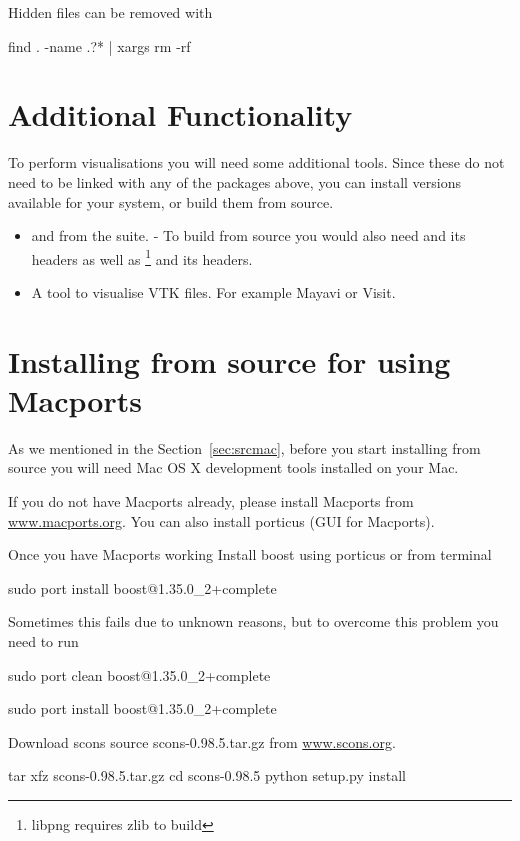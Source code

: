 Hidden files can be removed with
\begin{shellCode}
find . -name .?* | xargs rm -rf
\end{shellCode}

\section{Additional Functionality}\label{sec:macaddfunc}
To perform visualisations you will need some additional tools.
Since these do not need to be linked with any of the packages above, you can install versions available for your
system, or build them from source.
\begin{itemize}
\item {} and  from the  suite. - To build from source 
you would also need  and its headers as well as \footnote{libpng requires zlib to build} and its headers.
\item A tool to visualise VTK files. For example Mayavi or Visit.
\end{itemize}


\section{Installing from source for \macosx using Macports}
\label{sec:srcmacports}

As we mentioned in the Section~\ref{sec:srcmac}, before you start installing from source you will need Mac OS X development tools installed on your Mac. 

If you do not have Macports already, please install Macports from \url{www.macports.org}. You can also install porticus (GUI for Macports).
 
Once you have Macports working Install boost using porticus or from terminal 
\begin{shellCode}
sudo port install boost@1.35.0_2+complete
\end{shellCode}
Sometimes this fails due to unknown reasons, but to overcome this problem you need to run
\begin{shellCode}
sudo port clean boost@1.35.0_2+complete

sudo port install boost@1.35.0_2+complete
 \end{shellCode}
  
Download scons source scons-0.98.5.tar.gz from \url{www.scons.org}.
\begin{shellCode}
tar xfz scons-0.98.5.tar.gz
cd scons-0.98.5
python setup.py install
\end{shellCode}

